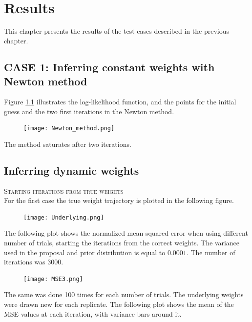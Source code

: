 
\chapter{Results}

This chapter presents the results of the test cases described in the previous chapter.

\section{CASE 1: Inferring constant weights with Newton method}
Figure \ref{fig:Newton} illustrates the log-likelihood function, and the points for the initial guess and the two first iterations in the Newton method.


\begin{figure}[hbt!]
\caption{}
\label{fig:Newton}
    \centering
    \texttt{[image: Newton\_method.png]}
\end{figure}

The method saturates after two iterations. 

\section{Inferring dynamic weights}

\textsc{Starting iterations from true weights}\\
For the first case the true weight trajectory is plotted in the following figure. 


\begin{figure}[hbt!]
    \centering
    \texttt{[image: Underlying.png]}
\end{figure}

The following plot shows the normalized mean squared error when using different number of trials, starting the iterations from the correct weights. The variance used in the proposal and prior distribution is equal to $0.0001$. The number of iterations was 3000.

\begin{figure}[hbt!]
    \centering
    \texttt{[image: MSE3.png]}
\end{figure}

The same was done 100 times for each number of trials. The underlying weights were drawn new for each replicate. The following plot shows the mean of the MSE values at each iteration, with variance bars around it. 

